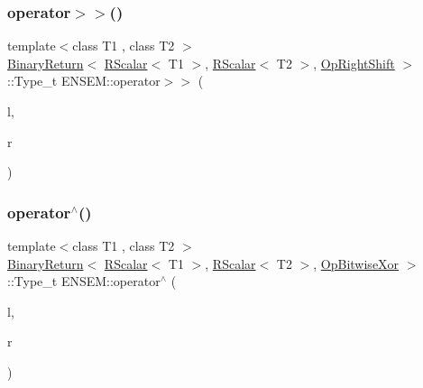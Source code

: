 \mbox{\label{group__rscalar_ga2b0d653b11b094308672a6a37a90d2c3}} 
\subsubsection{\texorpdfstring{operator$>$$>$()}{operator>>()}\hspace{0.1cm}{\footnotesize\ttfamily [3/3]}}
{\footnotesize\ttfamily template$<$class T1 , class T2 $>$ \\
\mbox{\hyperlink{structENSEM_1_1BinaryReturn}{Binary\+Return}}$<$ \mbox{\hyperlink{classENSEM_1_1RScalar}{R\+Scalar}}$<$ T1 $>$, \mbox{\hyperlink{classENSEM_1_1RScalar}{R\+Scalar}}$<$ T2 $>$, \mbox{\hyperlink{structENSEM_1_1OpRightShift}{Op\+Right\+Shift}} $>$\+::Type\+\_\+t E\+N\+S\+E\+M\+::operator$>$$>$ (\begin{DoxyParamCaption}\item[{const \mbox{\hyperlink{classENSEM_1_1RScalar}{R\+Scalar}}$<$ T1 $>$ \&}]{l,  }\item[{const \mbox{\hyperlink{classENSEM_1_1RScalar}{R\+Scalar}}$<$ T2 $>$ \&}]{r }\end{DoxyParamCaption})\hspace{0.3cm}{\ttfamily [inline]}}

\mbox{\label{group__rscalar_gaded7a3a7e06c5438511a12e861cbd165}} 
\subsubsection{\texorpdfstring{operator$^\wedge$()}{operator^()}}
{\footnotesize\ttfamily template$<$class T1 , class T2 $>$ \\
\mbox{\hyperlink{structENSEM_1_1BinaryReturn}{Binary\+Return}}$<$ \mbox{\hyperlink{classENSEM_1_1RScalar}{R\+Scalar}}$<$ T1 $>$, \mbox{\hyperlink{classENSEM_1_1RScalar}{R\+Scalar}}$<$ T2 $>$, \mbox{\hyperlink{structENSEM_1_1OpBitwiseXor}{Op\+Bitwise\+Xor}} $>$\+::Type\+\_\+t E\+N\+S\+E\+M\+::operator$^\wedge$ (\begin{DoxyParamCaption}\item[{const \mbox{\hyperlink{classENSEM_1_1RScalar}{R\+Scalar}}$<$ T1 $>$ \&}]{l,  }\item[{const \mbox{\hyperlink{classENSEM_1_1RScalar}{R\+Scalar}}$<$ T2 $>$ \&}]{r }\end{DoxyParamCaption})\hspace{0.3cm}{\ttfamily [inline]}}

